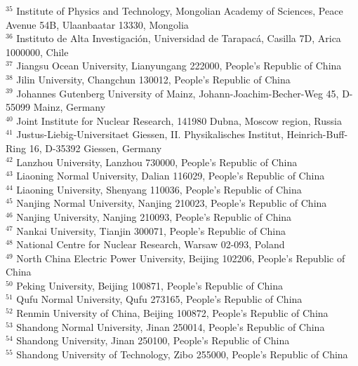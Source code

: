 \documentclass[prd,aps,reprint,noeprint,superscriptaddress,amsmath, amssymb]{revtex4-1}
\begin{document}
\begin{widetext}
\begin{center}
{$^{35}$ Institute of Physics and Technology, Mongolian Academy of Sciences, Peace Avenue 54B, Ulaanbaatar 13330, Mongolia\\
$^{36}$ Instituto de Alta Investigaci\'on, Universidad de Tarapac\'a, Casilla 7D, Arica 1000000, Chile\\
$^{37}$ Jiangsu Ocean University, Lianyungang 222000, People's Republic of China\\
$^{38}$ Jilin University, Changchun 130012, People's Republic of China\\
$^{39}$ Johannes Gutenberg University of Mainz, Johann-Joachim-Becher-Weg 45, D-55099 Mainz, Germany\\
$^{40}$ Joint Institute for Nuclear Research, 141980 Dubna, Moscow region, Russia\\
$^{41}$ Justus-Liebig-Universitaet Giessen, II. Physikalisches Institut, Heinrich-Buff-Ring 16, D-35392 Giessen, Germany\\
$^{42}$ Lanzhou University, Lanzhou 730000, People's Republic of China\\
$^{43}$ Liaoning Normal University, Dalian 116029, People's Republic of China\\
$^{44}$ Liaoning University, Shenyang 110036, People's Republic of China\\
$^{45}$ Nanjing Normal University, Nanjing 210023, People's Republic of China\\
$^{46}$ Nanjing University, Nanjing 210093, People's Republic of China\\
$^{47}$ Nankai University, Tianjin 300071, People's Republic of China\\
$^{48}$ National Centre for Nuclear Research, Warsaw 02-093, Poland\\
$^{49}$ North China Electric Power University, Beijing 102206, People's Republic of China\\
$^{50}$ Peking University, Beijing 100871, People's Republic of China\\
$^{51}$ Qufu Normal University, Qufu 273165, People's Republic of China\\
$^{52}$ Renmin University of China, Beijing 100872, People's Republic of China\\
$^{53}$ Shandong Normal University, Jinan 250014, People's Republic of China\\
$^{54}$ Shandong University, Jinan 250100, People's Republic of China\\
$^{55}$ Shandong University of Technology, Zibo 255000, People's Republic of China\\
}
\end{center}
\end{widetext}
\end{document}
